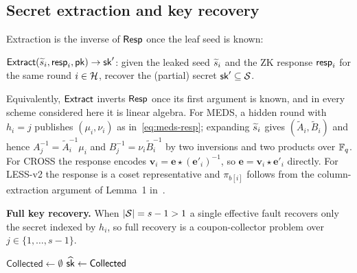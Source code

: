 \subsection{Secret extraction and key recovery}
\label{sec:extract}

Extraction is the inverse of $\mathsf{Resp}$ once the leaf seed is known:

\begin{definition}[Extract]
\label{def:extract}
$\mathsf{Extract}(\widetilde{s}_i, \mathsf{resp}_i, \mathsf{pk}) \to \mathsf{sk}'$: given the leaked seed
$\widetilde{s}_i$ and the ZK response $\mathsf{resp}_i$ for the same round $i \in \mathcal{H}$,
recover the (partial) secret $\mathsf{sk}' \subseteq \mathcal{S}$.
\end{definition}

Equivalently, $\mathsf{Extract}$ inverts $\mathsf{Resp}$ once its first argument is known,
and in every scheme considered here it is linear algebra. For MEDS, a hidden
round with $h_i = j$ publishes $(\mu_i,\nu_i)$ as in~\eqref{eq:meds-resp};
expanding $\widetilde{s}_i$ gives $(\tilde{A}_i,\tilde{B}_i)$ and hence
$A_j^{-1} = \tilde{A}_i^{-1}\mu_i$ and $B_j^{-1} = \nu_i \tilde{B}_i^{-1}$ by
two inversions and two products over $\mathbb{F}_q$. For CROSS the response encodes
$\mathbf{v}_i = \mathbf{e} \star (\mathbf{e}'_i)^{-1}$, so
$\mathbf{e} = \mathbf{v}_i \star \mathbf{e}'_i$ directly. For LESS-v2 the
response is a coset representative and $\pi_{b[i]}$ follows from the
column-extraction argument of Lemma~1 in~\cite{FaultToForge2025}.

\noindent\textbf{Full key recovery.}
When $|\mathcal{S}| = s-1 > 1$ a single effective fault recovers only the secret
indexed by $h_i$, so full recovery is a coupon-collector problem over
$j \in \{1,\ldots,s-1\}$.

\begin{algorithm}[tb]
\caption{GZKST key recovery from faulted oracle}
\label{alg:key-recovery}
$\mathsf{Collected} \leftarrow \emptyset$\;
\Return $\widehat{\mathsf{sk}} \leftarrow \mathsf{Collected}$\;
\end{algorithm}

